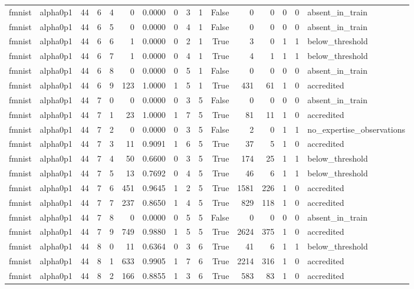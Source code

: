 \begin{tabular}{llrrrrrrrrrrrrrl}
fmnist & alpha0p1 & 44 & 6 & 4 & 0 & 0.0000 & 0 & 3 & 1 & False & 0 & 0 & 0 & 0 & absent\_in\_train \\
fmnist & alpha0p1 & 44 & 6 & 5 & 0 & 0.0000 & 0 & 4 & 1 & False & 0 & 0 & 0 & 0 & absent\_in\_train \\
fmnist & alpha0p1 & 44 & 6 & 6 & 1 & 0.0000 & 0 & 2 & 1 & True & 3 & 0 & 1 & 1 & below\_threshold \\
fmnist & alpha0p1 & 44 & 6 & 7 & 1 & 0.0000 & 0 & 4 & 1 & True & 4 & 1 & 1 & 1 & below\_threshold \\
fmnist & alpha0p1 & 44 & 6 & 8 & 0 & 0.0000 & 0 & 5 & 1 & False & 0 & 0 & 0 & 0 & absent\_in\_train \\
fmnist & alpha0p1 & 44 & 6 & 9 & 123 & 1.0000 & 1 & 5 & 1 & True & 431 & 61 & 1 & 0 & accredited \\
fmnist & alpha0p1 & 44 & 7 & 0 & 0 & 0.0000 & 0 & 3 & 5 & False & 0 & 0 & 0 & 0 & absent\_in\_train \\
fmnist & alpha0p1 & 44 & 7 & 1 & 23 & 1.0000 & 1 & 7 & 5 & True & 81 & 11 & 1 & 0 & accredited \\
fmnist & alpha0p1 & 44 & 7 & 2 & 0 & 0.0000 & 0 & 3 & 5 & False & 2 & 0 & 1 & 1 & no\_expertise\_observations \\
fmnist & alpha0p1 & 44 & 7 & 3 & 11 & 0.9091 & 1 & 6 & 5 & True & 37 & 5 & 1 & 0 & accredited \\
fmnist & alpha0p1 & 44 & 7 & 4 & 50 & 0.6600 & 0 & 3 & 5 & True & 174 & 25 & 1 & 1 & below\_threshold \\
fmnist & alpha0p1 & 44 & 7 & 5 & 13 & 0.7692 & 0 & 4 & 5 & True & 46 & 6 & 1 & 1 & below\_threshold \\
fmnist & alpha0p1 & 44 & 7 & 6 & 451 & 0.9645 & 1 & 2 & 5 & True & 1581 & 226 & 1 & 0 & accredited \\
fmnist & alpha0p1 & 44 & 7 & 7 & 237 & 0.8650 & 1 & 4 & 5 & True & 829 & 118 & 1 & 0 & accredited \\
fmnist & alpha0p1 & 44 & 7 & 8 & 0 & 0.0000 & 0 & 5 & 5 & False & 0 & 0 & 0 & 0 & absent\_in\_train \\
fmnist & alpha0p1 & 44 & 7 & 9 & 749 & 0.9880 & 1 & 5 & 5 & True & 2624 & 375 & 1 & 0 & accredited \\
fmnist & alpha0p1 & 44 & 8 & 0 & 11 & 0.6364 & 0 & 3 & 6 & True & 41 & 6 & 1 & 1 & below\_threshold \\
fmnist & alpha0p1 & 44 & 8 & 1 & 633 & 0.9905 & 1 & 7 & 6 & True & 2214 & 316 & 1 & 0 & accredited \\
fmnist & alpha0p1 & 44 & 8 & 2 & 166 & 0.8855 & 1 & 3 & 6 & True & 583 & 83 & 1 & 0 & accredited \\

\end{tabular}
